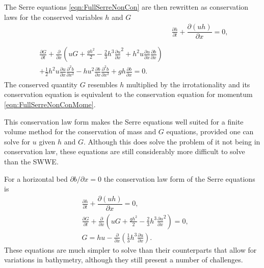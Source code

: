 The Serre equations \eqref{eqn:FullSerreNonCon} are then rewritten as conservation laws for the conserved variables $h$ and $G$
\begin{subequations}
	\label{eqn:FullSerreCon}
	\begin{align}
	& \frac{\partial h}{\partial t} + \dfrac{\partial (uh)}{\partial x} = 0 ,\label{eqn:FullSerreConMass}  \\ \nonumber \\
	\begin{split}
	\label{eqn:Serreconsconmom}
		\frac{\partial G}{\partial t}  + \frac{\partial}{\partial x} \left( {u} G + \frac{gh^2}{2} - \frac{2}{3}h^3 \frac{\partial {u}}{\partial x}^2 + h^2 {u}\frac{\partial {u}}{\partial x}\frac{\partial b}{\partial x} \right) \\ + \frac{1}{2}h^2 {u} \frac{\partial {u}}{\partial x} \frac{\partial^2 b}{\partial x^2}  - h {u}^2\frac{\partial b}{\partial x}\frac{\partial^2 b}{\partial x^2} + gh\frac{\partial b}{\partial x} = 0.
	\end{split}
	\end{align}
\end{subequations}
The conserved quantity $G$ resembles $h$ multiplied by the irrotationality \cite{Choi-Camassa-1999-1,Carter-Cienfuegos-2011-259} and its conservation equation is equivalent to the conservation equation for momentum \eqref{eqn:FullSerreNonConMome}.

This conservation law form makes the Serre equations well suited for a finite volume method for the conservation of mass and $G$ equations, provided one can solve for $u$ given $h$ and $G$. Although this does solve the problem of it not being in conservation law, these equations are still considerably more difficult to solve than the SWWE.

For a horizontal bed $\partial b / \partial x = 0$ the conservation law form of the Serre equations is
\begin{subequations}
	\label{eqn:FullSerreConHorizBed}
	\begin{align}
	&\frac{\partial h}{\partial t} + \dfrac{\partial (uh)}{\partial x} = 0, \label{eqn:FullSerreConMassHorizBed} \\
	&\frac{\partial G}{\partial t}   + \frac{\partial}{\partial x} \left( {u} G + \frac{gh^2}{2} - \frac{2}{3}h^3 \frac{\partial {u}}{\partial x}^2 \right) = 0 , \label{eqn:SerreconsconmomHorizBed}\\
	&G =  h {u}  - \frac{\partial}{\partial x}\left(\frac{1}{3}h^3  \frac{\partial {u}}{\partial x}\right). \label{defn:SerreEqnConservedQuantity1HorizBed}
	\end{align}
\end{subequations}
These equations are much simpler to solve than their counterparts that allow for variations in bathymetry, although they still present a number of challenges.

